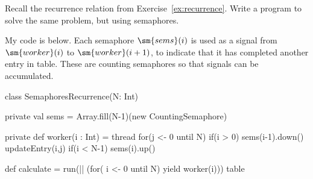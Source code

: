 \begin{question}
Recall the recurrence relation from Exercise~\ref{ex:recurrence}.  Write a
program to solve the same problem, but using semaphores. 
\end{question}

\begin{answerI}
My code is below.  Each semaphore $\sm{sems}(i)$ is used as a signal from
$\sm{worker}(i)$ to $\sm{worker}(i+1)$, to indicate that it has completed
another entry in table.  These are counting semaphores so that signals can be
accumulated.
%
\begin{scala}
class SemaphoresRecurrence(N: Int){
  private val sems = Array.fill(N-1)(new CountingSemaphore)

  private def worker(i : Int) = thread{
    for(j <- 0 until N){
      if(i > 0) sems(i-1).down()
      updateEntry(i,j)
      if(i < N-1) sems(i).up()
    }
  }

  def calculate = {
    run(|| (for( i <- 0 until N) yield worker(i)))
    table
  }
}
\end{scala}
\end{answerI}
